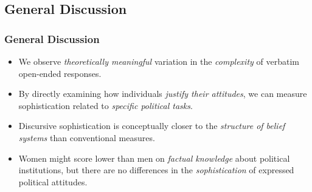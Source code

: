 \begin{frame}
    \begin{center}
    \end{center}
\end{frame}


\subsection{General Discussion}

\begin{frame}%
  \frametitle{General Discussion}
  \begin{itemize}
\item We observe \emph{theoretically meaningful} variation in the \emph{complexity} of verbatim open-ended responses.
\item<2->  By directly examining how individuals \emph{justify their attitudes}, we can measure sophistication related to \emph{specific political tasks}.
\item<3-> Discursive sophistication is conceptually closer to the \emph{structure of belief systems} than conventional measures.

\vspace{1em}
\item<4-> Women might score lower than men on \emph{factual knowledge} about political institutions, but there are no differences in the \emph{sophistication} of expressed political attitudes.
\end{itemize}
\end{frame}


